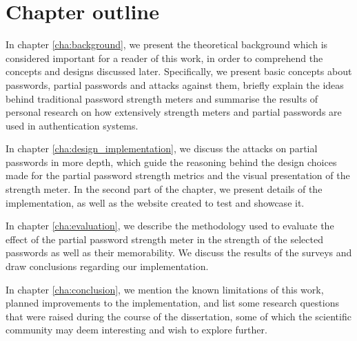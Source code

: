   \section{Chapter outline}
    \label{sec:outline}
    In chapter \ref{cha:background}, we present the theoretical background which is considered important for a reader of this work, in order to comprehend the concepts and designs discussed later. Specifically, we present basic concepts about passwords, partial passwords and attacks against them, briefly explain the ideas behind traditional password strength meters and summarise the results of personal research on how extensively strength meters and partial passwords are used in authentication systems.

    In chapter \ref{cha:design_implementation}, we discuss the attacks on partial passwords in more depth, which guide the reasoning behind the design choices made for the partial password strength metrics and the visual presentation of the strength meter. In the second part of the chapter, we present details of the implementation, as well as the website created to test and showcase it.

    In chapter \ref{cha:evaluation}, we describe the methodology used to evaluate the effect of the partial password strength meter in the strength of the selected passwords as well as their memorability. We discuss the results of the surveys and draw conclusions regarding our implementation.

    In chapter \ref{cha:conclusion}, we mention the known limitations of this work, planned improvements to the implementation, and list some research questions that were raised during the course of the dissertation, some of which the scientific community may deem interesting and wish to explore further.
